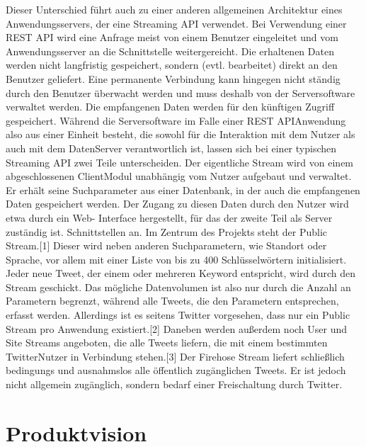 Dieser Unterschied führt auch zu einer anderen allgemeinen Architektur eines
Anwendungsservers, der eine Streaming API verwendet. Bei Verwendung einer REST API wird
eine Anfrage meist von einem Benutzer eingeleitet und vom Anwendungsserver an die
Schnittstelle weitergereicht. Die erhaltenen Daten werden nicht langfristig gespeichert,
sondern (evtl. bearbeitet) direkt an den Benutzer geliefert. Eine permanente Verbindung kann 
hingegen nicht ständig durch den Benutzer überwacht werden und muss deshalb von der 
Serversoftware verwaltet werden. Die empfangenen Daten werden für den künftigen Zugriff 
gespeichert. Während die Serversoftware im Falle einer REST API­Anwendung also aus einer Einheit 
besteht, die sowohl für die Interaktion mit dem Nutzer als auch mit dem Daten­Server verantwortlich
ist, lassen sich bei einer typischen Streaming API zwei Teile unterscheiden. Der eigentliche
Stream wird von einem abgeschlossenen Client­Modul unabhängig vom Nutzer aufgebaut und verwaltet. Er 
erhält seine Suchparameter aus einer Datenbank, in der auch die empfangenen Daten
gespeichert werden. Der Zugang zu diesen Daten durch den Nutzer wird etwa durch ein Web-
Interface hergestellt, für das der zweite Teil als Server zuständig ist. Schnittstellen an. Im 
Zentrum des Projekts steht der Public Stream.[1] Dieser wird neben anderen
Suchparametern, wie Standort oder Sprache, vor allem mit einer Liste von bis zu 400
Schlüsselwörtern initialisiert. Jeder neue Tweet, der einem oder mehreren Keyword entspricht,
wird durch den Stream geschickt. Das mögliche Datenvolumen ist also nur durch die Anzahl an
Parametern begrenzt, während alle Tweets, die den Parametern entsprechen, erfasst werden.
Allerdings ist es seitens Twitter vorgesehen, dass nur ein Public Stream pro Anwendung
existiert.[2] Daneben werden außerdem noch User und Site Streams angeboten, die alle Tweets 
liefern, die mit einem bestimmten Twitter­Nutzer in Verbindung stehen.[3] Der Firehose Stream
liefert schließlich bedingungs­ und ausnahmslos alle öffentlich zugänglichen Tweets. Er ist jedoch 
nicht allgemein zugänglich, sondern bedarf einer Freischaltung durch Twitter.

\section{Produktvision}

